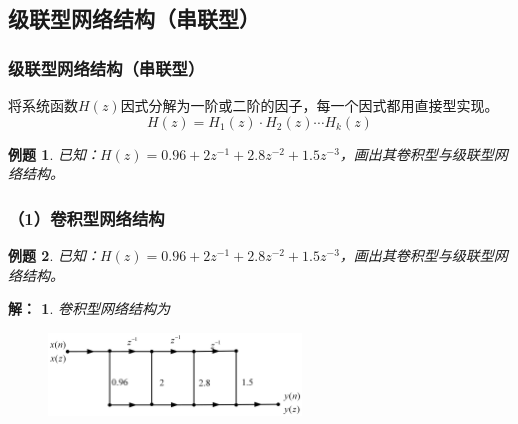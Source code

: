 \documentclass[notheorems,compress,mathserif,table]{beamer}
\newtheorem{example}{例题}
\newtheorem{answer}{解：}
\begin{document}
\subsection{级联型网络结构（串联型）}
\begin{frame}\frametitle{级联型网络结构（串联型）}%
将系统函数$H(z)$因式分解为一阶或二阶的因子，每一个因式都用直接型实现。
$$H(z)=H_1(z)\cdot H_2(z) \cdots H_k(z)$$
    \begin{example}
        \par 已知：$H(z) = 0.96+2z^{-1}+2.8z^{-2}+1.5z^{-3}$，画出其卷积型与级联型网络结构。
    \end{example}
\end{frame}
\begin{frame}\frametitle{（1）卷积型网络结构}%
    \begin{example}
        \par 已知：$H(z) = 0.96+2z^{-1}+2.8z^{-2}+1.5z^{-3}$，画出其卷积型与级联型网络结构。
    \end{example}
    \begin{answer}
        卷积型网络结构为
        \begin{figure}[h]
            \centering
            \includegraphics[width=0.6\textwidth]{lijuanjixing.jpg}
        \end{figure}
     \vspace{0.2cm}
    \end{answer}
\end{frame}
\end{document}
